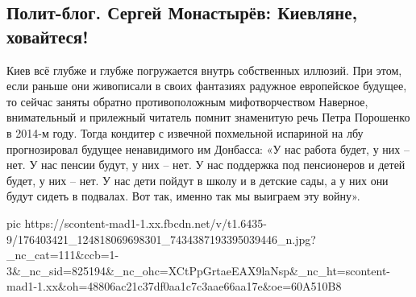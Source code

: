  
 
 
 
 
\subsection{Полит-блог. Сергей Монастырёв:  Киевляне, ховайтеся!}

Киев всё глубже и глубже погружается внутрь собственных иллюзий. При этом, если раньше они живописали в своих фантазиях радужное европейское будущее, то сейчас заняты обратно противоположным мифотворчеством
Наверное, внимательный и прилежный читатель помнит знаменитую речь Петра Порошенко в 2014-м году. Тогда кондитер с извечной похмельной испариной на лбу прогнозировал будущее ненавидимого им Донбасса:
«У нас работа будет, у них – нет. У нас пенсии будут, у них – нет. У нас поддержка под пенсионеров и детей будет, у них – нет. У нас дети пойдут в школу и в детские сады, а у них они будут сидеть в подвалах. Вот так, именно так мы выиграем эту войну».

\ifcmt
  pic https://scontent-mad1-1.xx.fbcdn.net/v/t1.6435-9/176403421_124818069698301_7434387193395039446_n.jpg?_nc_cat=111&ccb=1-3&_nc_sid=825194&_nc_ohc=XCtPpGrtaeEAX9laNsp&_nc_ht=scontent-mad1-1.xx&oh=48806ac21c37df0aa1c7c3aae66aa17e&oe=60A510B8
\fi

